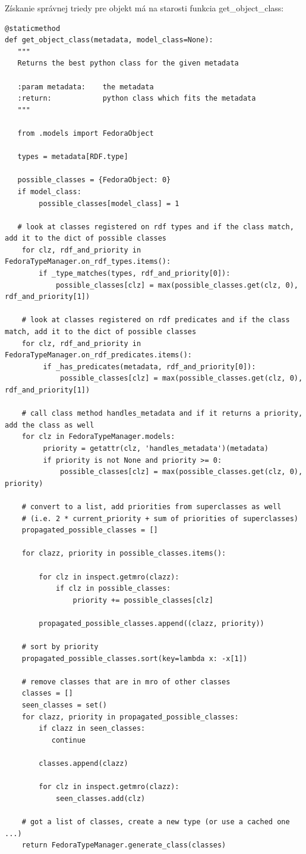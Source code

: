 \documentclass[thesis=M,slovak]{FITthesis}[2013/05/06]
\begin{document}
Získanie správnej triedy pre objekt má na starosti funkcia get\_object\_class:
\begin{lstlisting}[frame=single] 
@staticmethod
def get_object_class(metadata, model_class=None):
   """
   Returns the best python class for the given metadata

   :param metadata:    the metadata
   :return:            python class which fits the metadata
   """

   from .models import FedoraObject

   types = metadata[RDF.type]

   possible_classes = {FedoraObject: 0}
   if model_class:
        possible_classes[model_class] = 1

   # look at classes registered on rdf types and if the class match, add it to the dict of possible classes
    for clz, rdf_and_priority in FedoraTypeManager.on_rdf_types.items():
        if _type_matches(types, rdf_and_priority[0]):
            possible_classes[clz] = max(possible_classes.get(clz, 0), rdf_and_priority[1])

    # look at classes registered on rdf predicates and if the class match, add it to the dict of possible classes
    for clz, rdf_and_priority in FedoraTypeManager.on_rdf_predicates.items():
         if _has_predicates(metadata, rdf_and_priority[0]):
             possible_classes[clz] = max(possible_classes.get(clz, 0), rdf_and_priority[1])

    # call class method handles_metadata and if it returns a priority, add the class as well
    for clz in FedoraTypeManager.models:
         priority = getattr(clz, 'handles_metadata')(metadata)
         if priority is not None and priority >= 0:
             possible_classes[clz] = max(possible_classes.get(clz, 0), priority)

    # convert to a list, add priorities from superclasses as well
    # (i.e. 2 * current_priority + sum of priorities of superclasses)
    propagated_possible_classes = []

    for clazz, priority in possible_classes.items():

        for clz in inspect.getmro(clazz):
            if clz in possible_classes:
                priority += possible_classes[clz]

        propagated_possible_classes.append((clazz, priority))

    # sort by priority
    propagated_possible_classes.sort(key=lambda x: -x[1])

    # remove classes that are in mro of other classes
    classes = []
    seen_classes = set()
    for clazz, priority in propagated_possible_classes:
        if clazz in seen_classes:
           continue

        classes.append(clazz)

        for clz in inspect.getmro(clazz):
            seen_classes.add(clz)

    # got a list of classes, create a new type (or use a cached one ...)
    return FedoraTypeManager.generate_class(classes)
\end{lstlisting}
\end{document}
